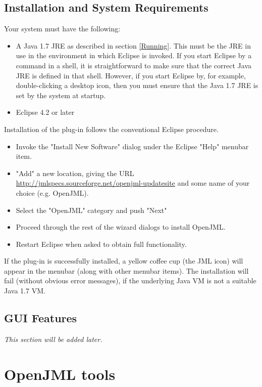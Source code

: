 \documentclass{report}%
\begin{document}
\section{Installation and System Requirements}
Your system must have the following:
\begin{itemize}
\item A Java 1.7 JRE as described in section \ref{Running}. This must be the JRE in use in the environment in which Eclipse is invoked. If you start Eclipse by a command in a shell, it is straightforward to make sure that the correct Java JRE is defined in that shell.  However, if you start Eclipse by, for example, double-clicking a desktop icon, then you must ensure that the Java 1.7 JRE is set by the system at startup.
\item Eclipse 4.2 or later
\end{itemize}

Installation of the plug-in follows the conventional Eclipse procedure.
\begin{itemize}
\item Invoke the "Install New Software" dialog under the Eclipse "Help" menubar item.
\item "Add" a new location, giving the URL \url{http://jmlspecs.sourceforge.net/openjml-updatesite} and some name of your choice (e.g. OpenJML).
\item Select the "OpenJML" category and push "Next"
\item Proceed through the rest of the wizard dialogs to install OpenJML.
\item Restart Eclipse when asked to obtain full functionality.
\end{itemize}

If the plug-in is successfully installed, a yellow coffee cup (the JML icon) will appear in the menubar (along with other menubar items).
The installation will fail (without obvious error messages), if the underlying Java VM is not a suitable Java 1.7 VM.

\section{GUI Features}

\textit{This section will be added later.} %


\chapter{OpenJML tools}
\end{document}
